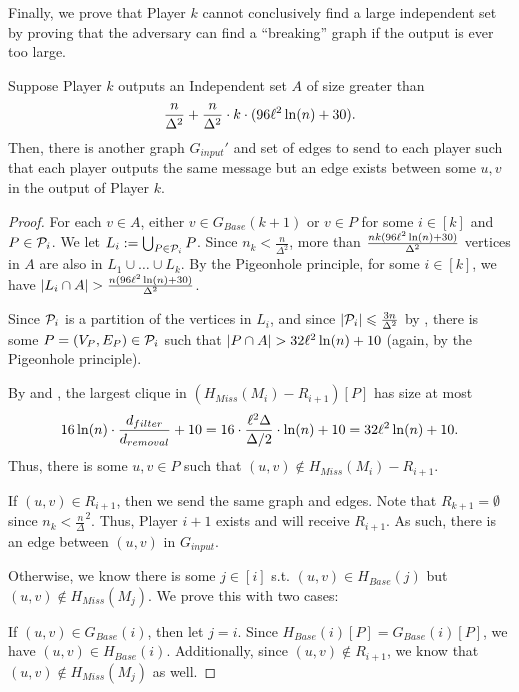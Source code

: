 \documentclass[11pt]{article}
\begin{document}
Finally, we prove that Player $k$ cannot conclusively find a large independent set by proving that the adversary can find a ``breaking'' graph if the output is ever too large. 

\begin{lemma}\label{find-breaking-element}
Suppose Player $k$ outputs an Independent set $A$ of size greater than 
\begin{align*}
    \frac{n}{\Delta^2}+\frac{n}{\Delta^2}\cdot k\cdot (96{\ell}^2\ln(n)+30).
\end{align*}
Then, there is another graph $G_{input}'$ and set of edges to send to each player such that each player outputs the same message but an edge exists between some $u, v$ in the output of Player $k$. 
\end{lemma}
\begin{proof}
For each $v\in A$, either $v\in G_{Base}(k+1)$ or $v\in P$ for some $i\in [k]$ and $P\in \mathcal{P}_i$. We let $L_i:=\bigcup_{P\in \mathcal{P}_i}P$. Since $n_k<\frac n{\Delta^2}$, more than $\frac{nk(96{\ell}^2\ln(n)+30)}{\Delta^2}$ vertices in $A$ are also in $L_1\cup\dots\cup L_k$. By the Pigeonhole principle, for some $i\in [k]$, we have $|L_i\cap A|>\frac{n(96{\distribFac}^2\ln (n) + 30)}{\Delta^2}$. 

Since $\mathcal{P}_i$ is a partition of the vertices in $L_i$, and since $|\mathcal{P}_i|\leqslant \frac{3n}{\Delta^2}$ by , there is some $P=(V_P, E_P)\in \mathcal{P}_i$ such that $|P\cap A|>32{\distribFac}^2\ln (n)+10$ (again, by the Pigeonhole principle).

By  and , the largest clique in $(H_{Miss}(M_i)-R_{i+1})[P]$ has size at most
\begin{align*}
16\ln(n)\cdot \frac{d_{filter}}{d_{removal}}+10=16\cdot \frac{{\ell}^2\Delta}{\Delta /2}\cdot \ln(n)+10=32{\ell}^2\ln(n)+10.
\end{align*}
Thus, there is some $u, v\in P$ such that $(u, v)\not\in H_{Miss}(M_i)-R_{i+1}$. 

If $(u, v)\in R_{i+1}$, then we send the same graph and edges. Note that $R_{k+1}=\emptyset$ since $n_k<\frac n{\Delta}^2$. Thus, Player $i+1$ exists and will receive $R_{i+1}$. As such, there is an edge between $(u, v)$ in $G_{input}$. 

Otherwise, we know there is some $j\in [i]$ s.t. $(u, v)\in H_{Base}(j)$ but $(u, v)\not\in H_{Miss}(M_j)$. We prove this with two cases:

If $(u, v)\in G_{Base}(i)$, then let $j=i$. Since $H_{Base}(i)[P]=G_{Base}(i)[P]$, we have $(u, v)\in H_{Base}(i)$. Additionally, since $(u, v)\not\in R_{i+1}$, we know that $(u, v)\not\in H_{Miss}(M_j)$ as well.


\end{proof}
\end{document}
